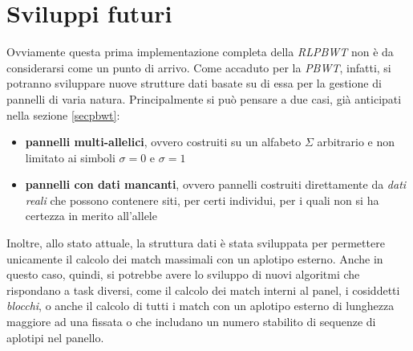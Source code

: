 \section{Sviluppi futuri}
Ovviamente questa prima implementazione completa della \textit{RLPBWT} non è da
considerarsi come un punto di arrivo. Come accaduto per la \textit{PBWT},
infatti, si potranno sviluppare nuove strutture dati basate su di essa per la
gestione di pannelli di varia natura. Principalmente si può pensare a due casi,
già anticipati nella sezione \ref{secpbwt}:
\begin{itemize}
  \item \textbf{pannelli multi-allelici}, ovvero costruiti su un alfabeto
  $\Sigma$ arbitrario e non limitato ai simboli $\sigma=0$ e $\sigma=1$
  \item \textbf{pannelli con dati mancanti}, ovvero pannelli costruiti
  direttamente da \textit{dati reali} che possono contenere siti, per certi
  individui, per i quali non si ha certezza in merito all'allele
\end{itemize}
Inoltre, allo stato attuale, la struttura dati è stata sviluppata per permettere
unicamente il calcolo dei match massimali con un aplotipo esterno. Anche in
questo caso, quindi, si potrebbe avere lo sviluppo di nuovi algoritmi che
rispondano a task diversi, come il calcolo dei match interni al panel, i
cosiddetti \textit{blocchi}, o anche il calcolo di tutti i match con un aplotipo
esterno di lunghezza maggiore ad una fissata o che includano un numero stabilito
di sequenze di aplotipi nel panello.
